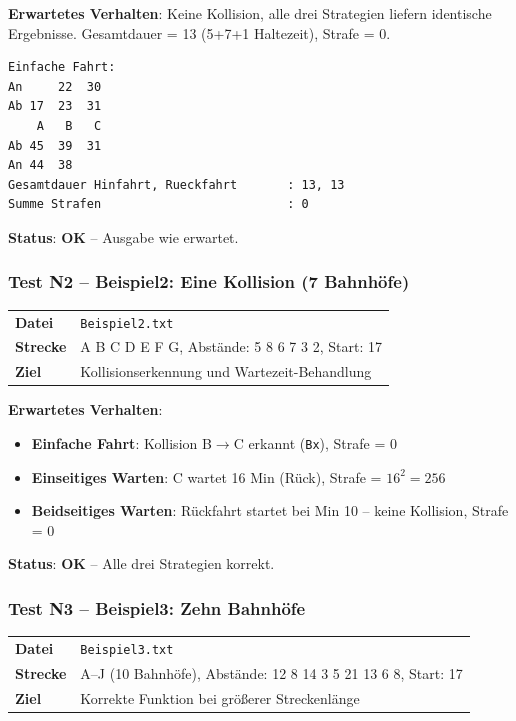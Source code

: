 \documentclass[12pt,a4paper]{article}
\newcommand{\pass}{\textcolor{passgreen}{\textbf{OK}}}
\begin{document}
\textbf{Erwartetes Verhalten}: Keine Kollision, alle drei Strategien liefern identische Ergebnisse. Gesamtdauer = 13 (5+7+1 Haltezeit), Strafe = 0.

\begin{lstlisting}[caption={Erwartete Ausgabe N1}]
Einfache Fahrt:
An     22  30
Ab 17  23  31
    A   B   C
Ab 45  39  31
An 44  38
Gesamtdauer Hinfahrt, Rueckfahrt       : 13, 13
Summe Strafen                          : 0
\end{lstlisting}

\textbf{Status}: \pass{} -- Ausgabe wie erwartet.

\subsubsection{Test N2 -- Beispiel2: Eine Kollision (7 Bahnhöfe)}

\begin{center}
\begin{tabular}{ll}
\toprule
\textbf{Datei} & \texttt{Beispiel2.txt} \\
\textbf{Strecke} & A B C D E F G, Abstände: 5 8 6 7 3 2, Start: 17 \\
\textbf{Ziel} & Kollisionserkennung und Wartezeit-Behandlung \\
\bottomrule
\end{tabular}
\end{center}

\textbf{Erwartetes Verhalten}:
\begin{itemize}
    \item \textbf{Einfache Fahrt}: Kollision B$\to$C erkannt (\texttt{Bx}), Strafe = 0
    \item \textbf{Einseitiges Warten}: C wartet 16 Min (Rück), Strafe = $16^2 = 256$
    \item \textbf{Beidseitiges Warten}: Rückfahrt startet bei Min 10 -- keine Kollision, Strafe = 0
\end{itemize}

\textbf{Status}: \pass{} -- Alle drei Strategien korrekt.

\subsubsection{Test N3 -- Beispiel3: Zehn Bahnhöfe}

\begin{center}
\begin{tabular}{ll}
\toprule
\textbf{Datei} & \texttt{Beispiel3.txt} \\
\textbf{Strecke} & A--J (10 Bahnhöfe), Abstände: 12 8 14 3 5 21 13 6 8, Start: 17 \\
\textbf{Ziel} & Korrekte Funktion bei größerer Streckenlänge \\
\bottomrule
\end{tabular}
\end{center}
\end{document}

